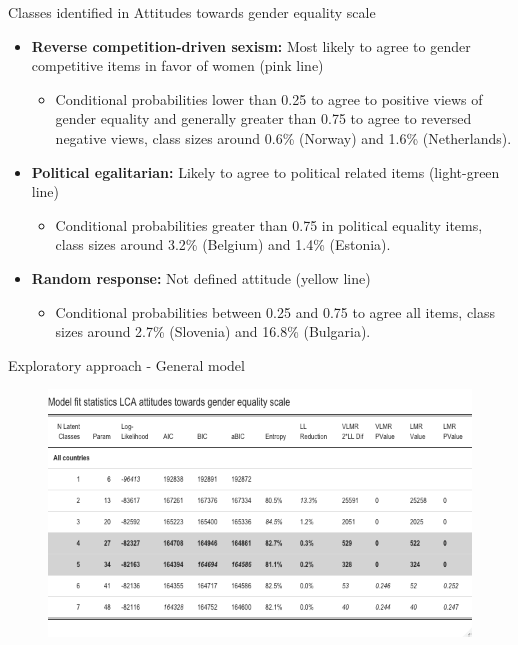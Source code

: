 \documentclass[11pt,t]{beamer}
\begin{document}
\begin{frame}{Classes identified in Attitudes towards gender equality scale}
\vspace{-5pt}

\begin{itemize}
\item \textbf{Reverse competition-driven sexism:} Most likely to agree to gender competitive items in favor of women (pink line)
\begin{itemize}
	\item Conditional probabilities lower than 0.25 to agree to positive views of gender equality and generally greater than 0.75 to agree to reversed negative views, class sizes around 0.6\% (Norway) and 1.6\% (Netherlands).  
\end{itemize}
\vspace{5pt}
\item \textbf{Political egalitarian:} Likely to agree to political related items (light-green line)

\begin{itemize}
	\item Conditional probabilities greater than 0.75 in political equality items, class sizes around 3.2\% (Belgium) and 1.4\% (Estonia).  
\end{itemize}
\vspace{5pt}
\item \textbf{Random response:} Not defined attitude (yellow line)

\begin{itemize}
	\item Conditional probabilities between 0.25 and 0.75 to agree all items, class sizes around 2.7\% (Slovenia) and 16.8\% (Bulgaria).  
\end{itemize}

\end{itemize}

\end{frame} 

\begin{frame}{Exploratory approach - General model}
	
\begin{figure}
	\centering
	\includegraphics[height=0.5\textwidth]{graphics/modelfitgender.png}
\end{figure}
	
\end{frame} 
\end{document}
